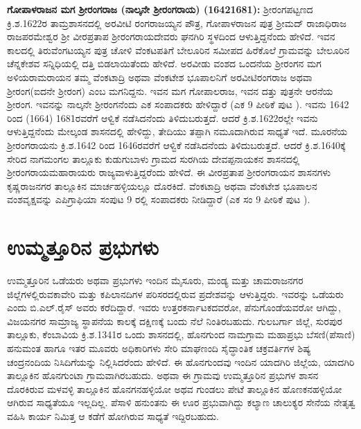 \textbf{ಗೋಪಾಳರಾಜನ ಮಗ ಶ‍್ರೀರಂಗರಾಜ (ನಾಲ್ಕನೇ ಶ‍್ರೀರಂಗರಾಯ) (1642\general{\enginline{-}}1681): } ಶ‍್ರೀರಂಗಪಟ್ಟಣದ ಕ್ರಿ.ಶ.1622ರ ತಾಮ್ರಶಾಸನದಲ್ಲಿ ಅರವೀಟಿ ರಂಗರಾಜಯ್ಯನ ಪೌತ್ರ, ಗೋಪಾಳರಾಜನ ಪುತ್ರ ಶ‍್ರೀಮದ್​ ರಾಜಾಧಿರಾಜ ರಾಜಪರಮೇಶ್ವರ ಶ‍್ರೀ ವೀರಪ್ರತಾಪ ಶ‍್ರೀರಂಗರಾಯದೇವರು ಘನಗಿರಿ ಸ್ಥಳದಿಂದ ಆಳುತ್ತಿದ್ದನೆಂದು ಹೇಳಿದೆ. ಇವನ ಕಾಲದಲ್ಲಿ ತಿರುವೆಂಗಟಯ್ಯನ ಪುತ್ರ ಚೋಳಿ ವೆಂಕಟಪತಿಗೆ ಬೇಲೂರಿನ ಸಮೀಪದ ಹಿರೆಕೊಲೆ ಗ್ರಾಮವನ್ನು ಬೇಲೂರಿನ ಚೆನ್ನಕೇಶವ ಸನ್ನಿಧಿಯಲ್ಲಿ ದತ್ತಿ ಬಿಡಲಾಯಿತೆಂದು ಹೇಳಿದೆ. ಅರವೀಡು ವಂಶದ ಒಂದನೆಯ ಶ‍್ರೀರಂಗನ ಮಗ ಅಳಿಯರಾಮರಾಯನ ತಮ್ಮ ವೆಂಕಟಾದ್ರಿ ಅಥವಾ ವೆಂಕಟೇಶ ಭೂಪಾಲನಿಗೆ ಅರವೀಟಿರಂಗರಾಜ ಅಥವಾ ಶ‍್ರೀರಂಗ(ಐದನೇ ಶ‍್ರೀರಂಗ) ಎಂಬ ಮಗನಿದ್ದನು. ಇವನ ಮಗ ಗೋಪಾಲರಾಜ, ಇವನ ದತ್ತು ಪುತ್ರನೇ ಆರನೆಯ ಶ‍್ರೀರಂಗ. ಇವನನ್ನು ನಾಲ್ಕನೇ ಶ‍್ರೀರಂಗನೆಂದು ಎಕ ಸಂಪಾದಕರು ಹೇಳಿದ್ದಾರೆ (ಎಕ 9 ಪೀಠಿಕೆ ಪುಟ ). ಇವನು 1642 ರಿಂದ (1664) 1681ರವರೆಗೆ ಆಳ್ವಿಕೆ ನಡೆಸಿದನೆಂದು ತಿಳಿದುಬರುತ್ತದೆ. ಆದರೆ ಕ್ರಿ.ಶ.1622ರಲ್ಲೇ ಇವನು ಆಳುತ್ತಿದ್ದನೆಂದು ಮೇಲ್ಕಂಡ ಶಾಸನದಲ್ಲಿ ಹೇಳಿದ್ದು, ತೇದಿಯು ತಪ್ಪಾಗಿ ನಮೂದಾಗಿರುವ ಸಾಧ್ಯತೆ ಇದೆ. ಮೂರನೆಯ ಶ‍್ರೀರಂಗರಾಯನು ಕ್ರಿ.ಶ.1642 ರಿಂದ 1646ರವರೆಗೆ ಆಳ್ವಿಕೆ ನಡೆಸಿದನೆಂದು ತಿಳಿದುಬರುತ್ತದೆ. ಆದರೆ ಕ್ರಿ.ಶ.1640ಕ್ಕೆ ಸೇರಿದ ನಾಗಮಂಗಲ ತಾಲ್ಲೂಕು ಕುಡುಗುಬಾಳು ಗ್ರಾಮದ ಸುರಗಿಯ ದೇವಪ್ಪನಾಯಕನ ಶಾಸನದಲ್ಲಿ ಶ‍್ರೀರಂಗರಾಯಮಹಾರಾಯರು ರಾಜ್ಯವಾಳುತ್ತಿದ್ದರೆಂದು ಹೇಳಿದೆ. ಈ ವೀರಪ್ರತಾಪ ಶ‍್ರೀರಂಗರಾಯನ ಶಾಸನಗಳು ಕೃಷ್ಣರಾಜನಗರ ತಾಲ್ಲೂಕಿನ ಮಾರ್ಚಹಳ್ಳಿಯಲ್ಲೂ ದೊರಕಿದೆ. ವೆಂಕಟಾದ್ರಿ ಅಥವಾ ವೆಂಕಟೇಶ ಭೂಪಾಲನ ವಂಶವೃಕ್ಷವನ್ನು ಎಪಿಗ್ರಾಫಿಯಾ ಸಂಪುಟ 9 ರಲ್ಲಿ ಸಂಪಾದಕರು ನೀಡಿದ್ದಾರೆ (ಎಕ ಸಂ 9 ಪೀಠಿಕೆ ಪುಟ ).


\section{ಉಮ್ಮತ್ತೂರಿನ ಪ್ರಭುಗಳು}

ಉಮ್ಮತ್ತೂರಿನ ಒಡೆಯರು ಅಥವಾ ಪ್ರಭುಗಳು ಇಂದಿನ ಮೈಸೂರು, ಮಂಡ್ಯ ಮತ್ತು ಚಾಮರಾಜನಗರ ಜಿಲ್ಲೆಗಳಲ್ಲಿರುವ\break ಕಾವೇರಿ ಮತ್ತು ಕಪಿಲಾನದಿಗಳ ಪರಿಸರದಲ್ಲಿರುವ ಪ್ರದೇಶವನ್ನು ಆಳುತ್ತಿದ್ದರು. ಇವರನ್ನು ಒಡೆಯರು ಎಂದು ಬಿ.ಎಲ್​.ರೈಸ್​ ಅವರು ಕರೆದಿದ್ದಾರೆ. ಇವರು ಉತ್ತರಕರ್ನಾಟಕದವರೋ, ಪೆನುಗೊಂಡೆಯವರೋ ಆಗಿದ್ದು, ವಿಜಯನಗರ ಸಾಮ್ರಾಜ್ಯ ಸ್ಥಾಪನೆಯ ಕಾಲಕ್ಕೆ ದಕ್ಷಿಣಕ್ಕೆ ಬಂದು ನೆಲೆ ನಿಂತಿರಬಹುದು. ಗುಲಬರ್ಗಾ ಜಿಲ್ಲೆ, ಸುರಪುರ ತಾಲ್ಲೂಕು, ಕೆಂಬಾವಿಯ ಕ್ರಿ.ಶ.1341ರ ಒಂದು ಶಾಸನದಲ್ಲಿ, ಹೊನಗುಂದ ನಾಮಗ್ರಾಮ ಮಹಾಪ್ರಭು ಬೆಸಣಿ(ಪೆಸಾಣಿ) ಹನುಮಂತ ಹಾಗೂ ಇತರ ಮೂವರು ಅಧಿಕಾರಿಗಳು ಸೇರಿ ಮಾಘಣಂದಿ ಸೈದ್ಧಾಂತಿಕ ಚಕ್ರವರ್ತಿಗಳ ಶಿಷ್ಯ ಚಂದ್ರನಂದಿಯ ನಿಸಿದಿಗೆಯನ್ನು ನಿಲ್ಲಿಸಿದರೆಂದು ಹೇಳಿದೆ. ಈ ಹೊನಗುಂದವು ಇಂದಿನ ಯಾದಗಿರಿ ಜಿಲ್ಲೆಯ, ಯಾದಗಿರಿ ತಾಲ್ಲೂಕಿನ ಹೊನಗುಂಟಾ ಗ್ರಾಮವಾಗಿರಬಹುದು. ಅಥವಾ ಈ ಗ್ರಾಮವು ಉಮ್ಮತ್ತೂರಿನ ಪ್ರಭುಗಳ ಶಾಸನ ದೊರಕಿರುವ ಮಳವಳ್ಳಿ ತಾಲ್ಲೂಕಿನ ಹೊನಗನಹಳ್ಳಿಯೋ ಅಥವ ಗುಂಡಲು ಪೇಟೆ ತಾಲ್ಲೂಕಿನ ಹೊಣಕನಹಳ್ಳಿಯೋ ಆಗಿರುವ ಸಾಧ್ಯತೆಯೂ ಇಲ್ಲದಿಲ್ಲ. ಪೆಸಾಳಿ ಹನುಂತನು ಈ ಊರ ಪ್ರಭುವಾಗಿದ್ದು ಕಲ್ಯಾಣ ಚಾಲುಕ್ಯರ ಸೇನೆಯ ನೇತೃತ್ವ ವಹಿಸಿ ಕಾರ್ಯ ನಿಮಿತ್ತ ಆ ಕಡೆಗೆ ಹೋಗಿರುವ ಸಾಧ್ಯತೆ ಇದ್ದಿರಬಹುದು.

